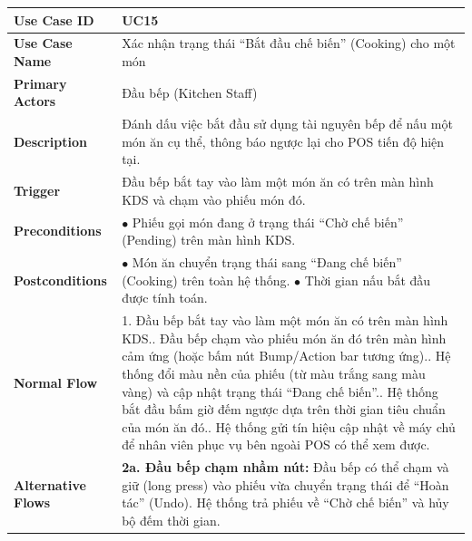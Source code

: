 \begin{longtable}{|L{3.5cm}|L{12.5cm}|}
\hline
\textbf{Use Case ID} & UC15 \\ \hline
\textbf{Use Case Name} & Xác nhận trạng thái ``Bắt đầu chế biến'' (Cooking) cho một món \\ \hline
\textbf{Primary Actors} & Đầu bếp (Kitchen Staff) \\ \hline
\textbf{Description} & Đánh dấu việc bắt đầu sử dụng tài nguyên bếp để nấu một món ăn cụ thể, thông báo ngược lại cho POS tiến độ hiện tại. \\ \hline
\textbf{Trigger} & Đầu bếp bắt tay vào làm một món ăn có trên màn hình KDS và chạm vào phiếu món đó. \\ \hline
\textbf{Preconditions} & $\bullet$ Phiếu gọi món đang ở trạng thái ``Chờ chế biến'' (Pending) trên màn hình KDS. \\ \hline
\textbf{Postconditions} &
$\bullet$ Món ăn chuyển trạng thái sang ``Đang chế biến'' (Cooking) trên toàn hệ thống.\newline
$\bullet$ Thời gian nấu bắt đầu được tính toán. \\ \hline
\textbf{Normal Flow} &
1. Đầu bếp bắt tay vào làm một món ăn có trên màn hình KDS.. Đầu bếp chạm vào phiếu món ăn đó trên màn hình cảm ứng (hoặc bấm nút Bump/Action bar tương ứng).. Hệ thống đổi màu nền của phiếu (từ màu trắng sang màu vàng) và cập nhật trạng thái ``Đang chế biến''.. Hệ thống bắt đầu bấm giờ đếm ngược dựa trên thời gian tiêu chuẩn của món ăn đó.. Hệ thống gửi tín hiệu cập nhật về máy chủ để nhân viên phục vụ bên ngoài POS có thể xem được. \\ \hline
\textbf{Alternative Flows} &
\textbf{2a. Đầu bếp chạm nhầm nút:} Đầu bếp có thể chạm và giữ (long press) vào phiếu vừa chuyển trạng thái để ``Hoàn tác'' (Undo). Hệ thống trả phiếu về ``Chờ chế biến'' và hủy bộ đếm thời gian. \\ \hline
\end{longtable}
